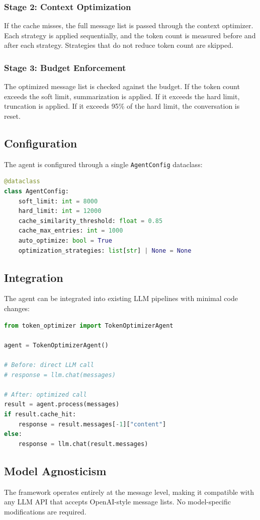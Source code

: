 \subsubsection{Stage 2: Context Optimization}

If the cache misses, the full message list is passed through the context optimizer. Each strategy is applied sequentially, and the token count is measured before and after each strategy. Strategies that do not reduce token count are skipped.

\subsubsection{Stage 3: Budget Enforcement}

The optimized message list is checked against the budget. If the token count exceeds the soft limit, summarization is applied. If it exceeds the hard limit, truncation is applied. If it exceeds 95\% of the hard limit, the conversation is reset.

\subsection{Configuration}

The agent is configured through a single \texttt{AgentConfig} dataclass:

\begin{lstlisting}[language=Python, caption=Agent configuration]
@dataclass
class AgentConfig:
    soft_limit: int = 8000
    hard_limit: int = 12000
    cache_similarity_threshold: float = 0.85
    cache_max_entries: int = 1000
    auto_optimize: bool = True
    optimization_strategies: list[str] | None = None
\end{lstlisting}

\subsection{Integration}

The agent can be integrated into existing LLM pipelines with minimal code changes:

\begin{lstlisting}[language=Python, caption=Integration example]
from token_optimizer import TokenOptimizerAgent

agent = TokenOptimizerAgent()

# Before: direct LLM call
# response = llm.chat(messages)

# After: optimized call
result = agent.process(messages)
if result.cache_hit:
    response = result.messages[-1]["content"]
else:
    response = llm.chat(result.messages)
\end{lstlisting}

\subsection{Model Agnosticism}

The framework operates entirely at the message level, making it compatible with any LLM API that accepts OpenAI-style message lists. No model-specific modifications are required.
